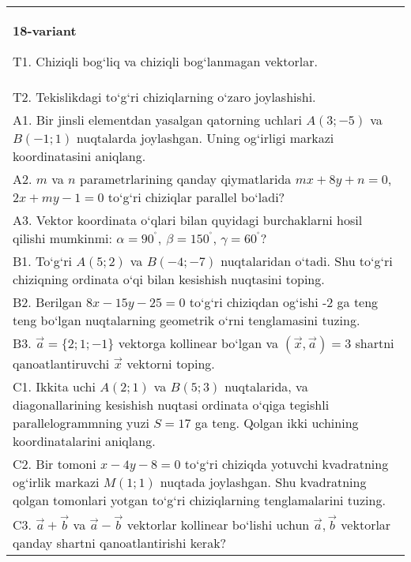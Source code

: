 \documentclass{article}
\begin{document}
\begin{tabular}{m{17cm}}
\textbf{18-variant}
\newline

T1. 
Chiziqli bog‘liq va chiziqli bog‘lanmagan vektorlar.
 \\
T2. 
Tekislikdagi to‘g‘ri chiziqlarning o‘zaro joylashishi.
 \\
A1. 
Bir jinsli elementdan yasalgan qatorning uchlari
$A (3;-5) $ va $B (-1;1) $ nuqtalarda joylashgan. Uning og‘irligi
markazi koordinatasini aniqlang.
 \\
A2. 
$m$ va $n$ parametrlarining qanday qiymatlarida
$mx+8y+n=0$, $2x+my-1=0$ to‘g‘ri chiziqlar parallel bo‘ladi?
 \\
A3. 
Vektor koordinata o‘qlari bilan quyidagi burchaklarni hosil qilishi
mumkinmi: $\alpha = 90^{{^\circ}},\ \beta = 150^{{^\circ}}$,
$\gamma = 60^{{^\circ}}?$
 \\
B1. 
To‘g‘ri \(A (5;2) \) va \(B (-4; -7) \) nuqtalaridan o‘tadi.
Shu to‘g‘ri chiziqning ordinata o‘qi bilan kesishish nuqtasini toping.
 \\
B2. 
Berilgan \(8x-15y-25=0\) to‘g‘ri chiziqdan og‘ishi -2 ga teng
teng bo‘lgan nuqtalarning geometrik o‘rni tenglamasini tuzing.
 \\
B3. 
$\vec{a} = \{ 2;1; - 1\}$ vektorga kollinear bo‘lgan va $\left(\vec{x},\vec{a} \right) = 3$ shartni qanoatlantiruvchi $\vec{x}$ vektorni toping.
 \\
C1. 
Ikkita uchi \(A (2;1) \) va \(B (5; 3) \) nuqtalarida, va
diagonallarining kesishish nuqtasi ordinata o‘qiga tegishli
parallelogrammning yuzi \(S = 17\) ga teng. Qolgan ikki uchining
koordinatalarini aniqlang. \\
C2. 
Bir tomoni \(x-4y - 8 = 0\) to‘g‘ri chiziqda yotuvchi
kvadratning og‘irlik markazi \(M (1;1) \) nuqtada joylashgan. Shu kvadratning
qolgan tomonlari yotgan to‘g‘ri chiziqlarning tenglamalarini tuzing.
 \\
C3. 
\(\vec{a}+\vec{b}\) va \(\vec{a} - \vec{b}\) vektorlar kollinear bo‘lishi uchun \(\vec{a},\vec{b}\) vektorlar qanday shartni qanoatlantirishi kerak?
 \\

\end{tabular}
\vspace{1cm}
\end{document}
